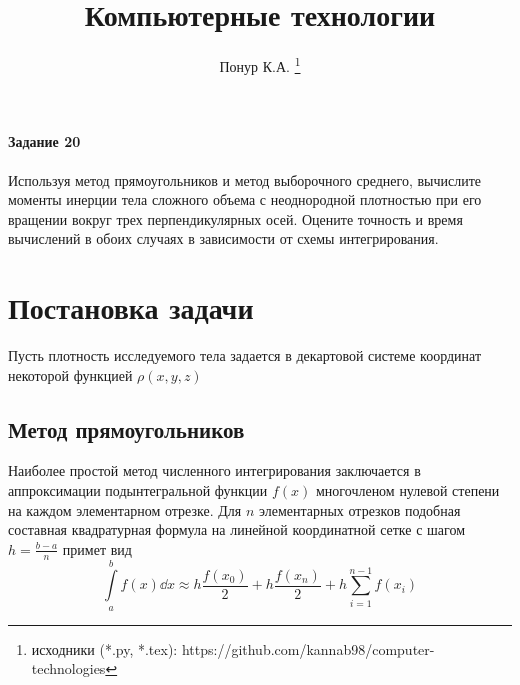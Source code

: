 
\title{Компьютерные технологии}
\author{Понур К.А. 
    \thanks{исходники (*.py, *.tex):
    https://github.com/kannab98/computer-technologies}
}


\maketitle

\paragraph{Задание 20} Используя метод  прямоугольников  и  метод  выборочного  среднего, вычислите моменты инерции тела сложного объема с неоднородной плотностью при его вращении вокруг трех  перпендикулярных  осей. Оцените точность  и  время  вычислений  в  обоих  случаях в зависимости от схемы интегрирования.

\tableofcontents
\section{Постановка задачи}


Пусть плотность исследуемого тела задается в декартовой системе координат 
некоторой функцией $\rho(x,y,z)$

\subsection{Метод прямоугольников}%
\label{sub:metod_priamougol_nikov}

Наиболее простой метод численного интегрирования заключается в аппроксимации
подынтегральной функции $f(x)$ многочленом нулевой степени на каждом
элементарном отрезке. Для $n$ элементарных отрезков подобная составная
квадратурная формула на линейной координатной сетке с шагом
$h=\frac{b-a}{n}$ примет вид
\begin{equation}
    \label{eq:}
    \int\limits_{a}^{b} f(x) \dd x \approx h\frac{f(x_0)}{2} +
    h\frac{f(x_n)}{2} + h\sum\limits_{i=1}^{n-1} f(x_i) 
\end{equation}

